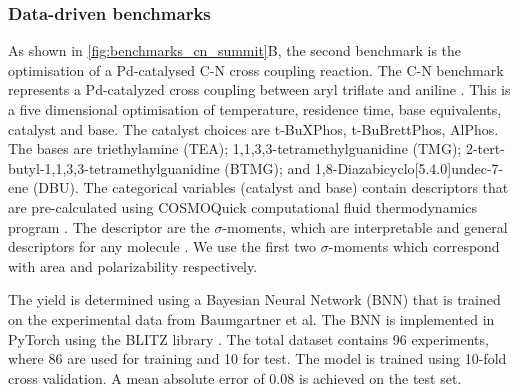  
\subsubsection{Data-driven benchmarks}

As shown in \ref{fig:benchmarks_cn_summit}B, the second benchmark is the optimisation of a Pd-catalysed C-N cross coupling reaction. The C-N benchmark represents a Pd-catalyzed cross coupling between aryl triflate and aniline \cite{Baumgartner2019}. This is a five dimensional optimisation of temperature, residence time, base equivalents, catalyst and base. The catalyst choices are t-BuXPhos, t-BuBrettPhos, AlPhos. The bases are triethylamine (TEA); 1,1,3,3-tetramethylguanidine (TMG); 2-tert-butyl-1,1,3,3-tetramethylguanidine (BTMG); and 1,8-Diazabicyclo[5.4.0]undec-7-ene (DBU). The categorical variables (catalyst and base) contain descriptors that are pre-calculated using COSMOQuick computational fluid thermodynamics program \cite{Loschen2012}. The descriptor are the $\sigma$-moments, which are interpretable and general descriptors for any molecule \cite{Zissimos2002}. We use the first two $\sigma$-moments which correspond with area and polarizability respectively.

The yield is determined using a Bayesian Neural Network (BNN) that is trained on the experimental data from Baumgartner et al.\cite{Baumgartner2019} The BNN is implemented in PyTorch \cite{Paszke2019} using the BLITZ library \cite{Esposito2020}. The total dataset contains 96 experiments, where 86 are used for training and 10 for test. The model is trained using 10-fold cross validation. A mean absolute error of 0.08 is achieved on the test set.


